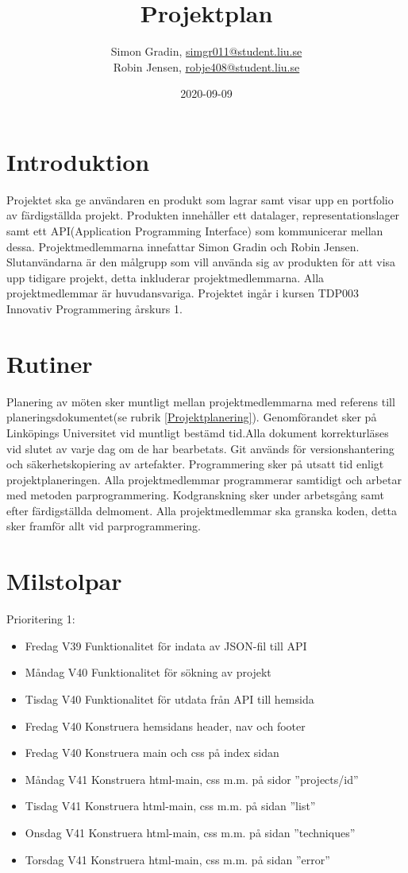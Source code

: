 \documentclass{TDP003mall}
\author{Simon Gradin, \url{simgr011@student.liu.se}\\
  Robin Jensen, \url{robje408@student.liu.se}}
\title{Projektplan}
\date{2020-09-09}
\begin{document}
\projectpage

\section{Introduktion}
Projektet ska ge användaren en produkt som lagrar samt visar upp en portfolio av färdigställda projekt. Produkten innehåller ett datalager, representationslager samt ett API(Application Programming Interface) som kommunicerar mellan dessa. Projektmedlemmarna innefattar Simon Gradin och Robin Jensen. Slutanvändarna är den målgrupp som vill använda sig av produkten för att visa upp tidigare projekt, detta inkluderar projektmedlemmarna. Alla projektmedlemmar är huvudansvariga. Projektet ingår i kursen TDP003 Innovativ Programmering årskurs 1. 


\section{Rutiner}
Planering av möten sker muntligt mellan projektmedlemmarna med referens till planeringsdokumentet(se rubrik \ref{Projektplanering}). Genomförandet sker på Linköpings Universitet vid muntligt bestämd tid.Alla dokument korrekturläses vid slutet av varje dag om de har bearbetats. Git används för versionshantering och säkerhetskopiering av artefakter. Programmering sker på utsatt tid enligt projektplaneringen. Alla projektmedlemmar programmerar samtidigt och arbetar med metoden parprogrammering. Kodgranskning sker under arbetsgång samt efter färdigställda delmoment. Alla projektmedlemmar ska granska koden, detta sker framför allt vid parprogrammering.     
 
\section{Milstolpar}
Prioritering 1: 
\begin{itemize}
\item{Fredag V39 Funktionalitet för indata av JSON-fil till API}
\item{Måndag V40 Funktionalitet för sökning av projekt}
\item{Tisdag V40 Funktionalitet för utdata från API till hemsida}
\item{Fredag V40 Konstruera hemsidans header, nav och footer}
\item{Fredag V40 Konstruera main och css på index sidan}
\item{Måndag V41 Konstruera html-main, css m.m. på sidor ''projects/id''}
\item{Tisdag V41 Konstruera html-main, css m.m. på sidan ''list''}
\item{Onsdag V41 Konstruera html-main, css m.m. på sidan ''techniques''}
\item{Torsdag V41 Konstruera html-main, css m.m. på sidan ''error''}
\end{itemize}
\end{document}
